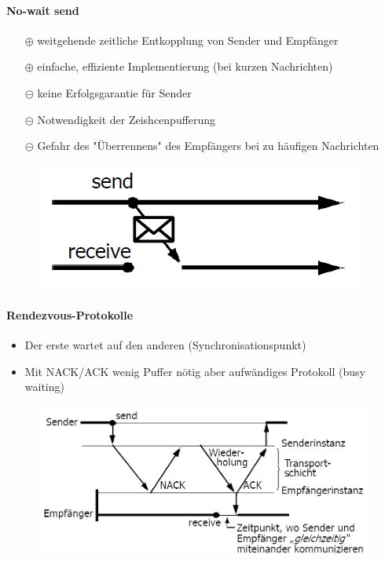 \documentclass[10pt,a4paper]{article}
\begin{document}
\paragraph{No-wait send}
\begin{itemize}
\item[$\oplus$]weitgehende zeitliche Entkopplung von Sender und Empfänger
\item[$\oplus$]einfache, effiziente Implementierung (bei kurzen Nachrichten)
\item[$\circleddash$]keine Erfolgsgarantie für Sender
\item[$\circleddash$]Notwendigkeit der Zeishcenpufferung
\item[$\circleddash$]Gefahr des "Überrennens" des Empfängers bei zu häufigen Nachrichten
\end{itemize}
\begin{figure}[h]
\includegraphics[scale=0.33]{./Bilder/No-wait_send}
\end{figure}

\paragraph{Rendezvous-Protokolle}
\begin{itemize}
\item Der erste wartet auf den anderen (Synchronisationspunkt)
\item Mit NACK/ACK wenig Puffer nötig aber aufwändiges Protokoll (busy waiting)
\end{itemize}
\begin{figure}[h]
\includegraphics[scale=0.33]{./Bilder/Rendezvous-Protokolle}
\end{figure}
\end{document}
